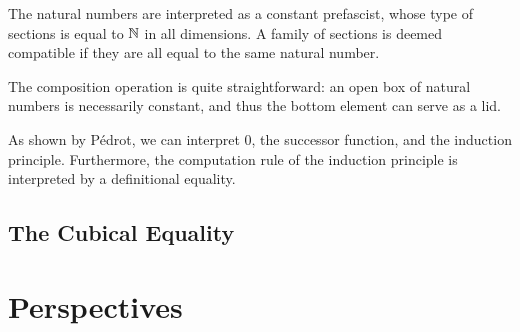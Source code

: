 The natural numbers are interpreted as a constant prefascist, whose type of
sections is equal to \( \mathbb{N} \) in all dimensions. A family of sections is 
deemed compatible if they are all equal to the same natural number.



The composition operation is quite straightforward: an open box of natural 
numbers is necessarily constant, and thus the bottom element can serve as
a lid.

As shown by Pédrot, we can interpret 0, the successor function, and the
induction principle. Furthermore, the computation rule of the induction
principle is interpreted by a definitional equality.

\subsection{The Cubical Equality}



\section{Perspectives}